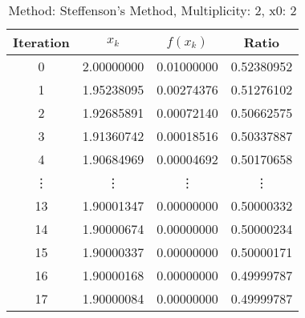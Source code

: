 \begin{table}
\centering
\caption{Method: Steffenson's Method, Multiplicity: 2, x0: 2}
\label{tab:table_Steffenson's_Method_2_2}
\begin{tabular}{c c c c}
\toprule
Iteration &      $x_k$ &   $f(x_k)$ &      Ratio \\
\midrule
        0 & 2.00000000 & 0.01000000 & 0.52380952 \\
        1 & 1.95238095 & 0.00274376 & 0.51276102 \\
        2 & 1.92685891 & 0.00072140 & 0.50662575 \\
        3 & 1.91360742 & 0.00018516 & 0.50337887 \\
        4 & 1.90684969 & 0.00004692 & 0.50170658 \\
   \vdots &     \vdots &     \vdots &     \vdots \\
       13 & 1.90001347 & 0.00000000 & 0.50000332 \\
       14 & 1.90000674 & 0.00000000 & 0.50000234 \\
       15 & 1.90000337 & 0.00000000 & 0.50000171 \\
       16 & 1.90000168 & 0.00000000 & 0.49999787 \\
       17 & 1.90000084 & 0.00000000 & 0.49999787 \\
\bottomrule
\end{tabular}
\end{table}
